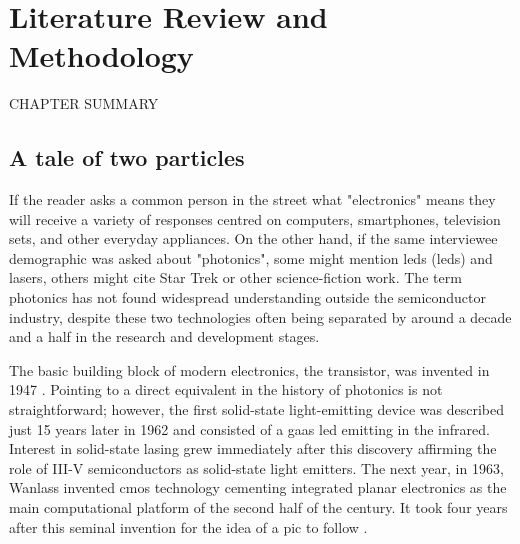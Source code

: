 \chapter{Literature Review and Methodology}
\label{chap:review}


CHAPTER SUMMARY

\section{A tale of two particles}

If the reader asks a common person in the street what "electronics" means they will receive a variety of responses centred on computers, smartphones, television sets, and other everyday appliances. On the other hand, if the same interviewee demographic was asked about "photonics", some might mention \acl{led}s (\acs{led}s) and lasers, others might cite Star Trek or other science-fiction work. The term photonics has not found widespread understanding outside the semiconductor industry, despite these two technologies often being separated by around a decade and a half in the research and development stages. 

The basic building block of modern electronics, the transistor, was invented in 1947 \cite{Bardeen1948, Bardeen1950}. Pointing to a direct equivalent in the history of photonics is not straightforward; however, the first solid-state light-emitting device was described just \num{15} years later in 1962 \cite{Biard1966} and consisted of a \acf{gaas} \acs{led} emitting in the infrared. Interest in solid-state lasing grew immediately after this discovery \cite{Hall1962, Hall1963} affirming the role of III-V semiconductors as solid-state light emitters. The next year, in 1963, Wanlass invented \acf{cmos} technology \cite{Wanlass1967} cementing integrated planar electronics as the main computational platform of the second half of the century. It took four years after this seminal invention for the idea of a \acf{pic} to follow \cite{Miller1969}.

